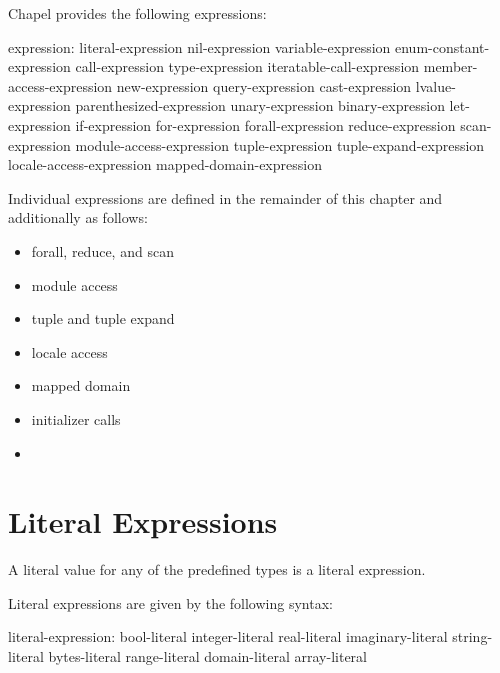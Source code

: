 \label{Expressions}

Chapel provides the following expressions:

\begin{syntax}
expression:
  literal-expression
  nil-expression
  variable-expression
  enum-constant-expression
  call-expression
  type-expression
  iteratable-call-expression
  member-access-expression
  new-expression
  query-expression
  cast-expression
  lvalue-expression
  parenthesized-expression
  unary-expression
  binary-expression
  let-expression
  if-expression
  for-expression
  forall-expression
  reduce-expression
  scan-expression
  module-access-expression
  tuple-expression
  tuple-expand-expression
  locale-access-expression
  mapped-domain-expression
\end{syntax}

Individual expressions are defined in the remainder of this chapter
and additionally as follows:

\begin{itemize}
\item forall, reduce, and scan 
\item module access 
\item tuple and tuple expand 
\item locale access 
\item mapped domain 
\item initializer calls 
\item {} 
\end{itemize}

\section{Literal Expressions}
\label{Literal_Expressions}

A literal value for any of the predefined types is a literal expression.

Literal expressions are given by the following syntax:
\begin{syntax}
literal-expression:
  bool-literal
  integer-literal
  real-literal
  imaginary-literal
  string-literal
  bytes-literal
  range-literal
  domain-literal
  array-literal
\end{syntax}

